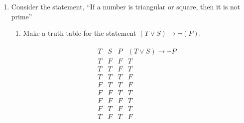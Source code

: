 \documentclass[11pt,a4paper]{article}
\begin{document}
\begin{enumerate}
\begin{enumerate}
\begin{enumerate}
                        \begin{align*}
                            \begin{array}{|c|c|c|c|c|}
                                P & Q & R & $\neg((\neg P\rightarrow\neg Q) \land (\neg Q\rightarrow R))$ & $(\neg P\land Q) \lor (\neg Q\land\neg R)$ $\\
                            \hline
                            T & F & F & T\\
                            T & T & F & T\\
                            T & T & T & F\\
                            F & T & T & F\\
                            F & F & T & T\\
                            F & F & F & T\\
                            F & T & F & T\\
                            T & F & T & F\\
                            \end{array}
                        \end{align*}

            \end{enumerate}

        \end{enumerate}

        \item Consider the statement, “If a number is triangular or square, then it is not prime”
            \begin{enumerate}
                \item Make a truth table for the statement $(T\lor S)\rightarrow\neg(P)$.

                \begin{align*}
                    \begin{array}{|c|c|c|c|}
                        T & S & P & (T\lor S)\rightarrow \neg P\\
                    \hline
                    T & F & F & T\\
                    T & T & F & T\\
                    T & T & T & F\\
                    F & T & T & F\\
                    F & F & T & T\\
                    F & F & F & T\\
                    F & T & F & T\\
                    T & F & T & F\\
                    \end{array}
                \end{align*}


\end{enumerate}
\end{enumerate}
\end{document}
